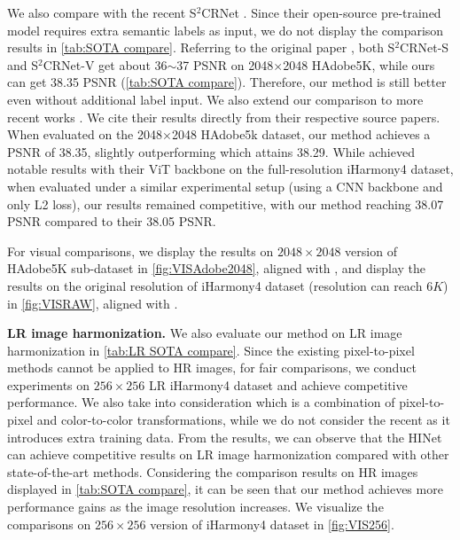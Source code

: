 \documentclass[10pt,journal,twocolumn,twoside]{IEEEtran}
\begin{document}
We also compare with the recent S$^2$CRNet \cite{liang2022spatial}. Since their open-source pre-trained model requires extra semantic labels as input, we do not display the comparison results in \cref{tab:SOTA compare}. Referring to the original paper \cite{liang2022spatial}, both S$^2$CRNet-S and S$^2$CRNet-V get about 36$\sim$37 PSNR on 2048$\times$2048 HAdobe5K, while ours can get 38.35 PSNR (\cref{tab:SOTA compare}). Therefore, our method is still better even without additional label input. We also extend our comparison to more recent works \cite{wang2023semi, guerreiro2023pct}. We cite their results directly from their respective source papers. When evaluated on the 2048$\times$2048 HAdobe5k dataset, our method achieves a PSNR of 38.35, slightly outperforming \cite{wang2023semi} which attains 38.29. While \cite{guerreiro2023pct} achieved notable results with their ViT backbone on the full-resolution iHarmony4 dataset, when evaluated under a similar experimental setup (using a CNN backbone and only L2 loss), our results remained competitive, with our method reaching 38.07 PSNR compared to their 38.05 PSNR.

For visual comparisons, we display the results on $2048\times 2048$ version of HAdobe5K sub-dataset in \cref{fig:VISAdobe2048}, aligned with \cite{cong2022high}, and display the results on the original resolution of iHarmony4 dataset (resolution can reach $6K$) in \cref{fig:VISRAW}, aligned with \cite{xue2022dccf, ke2022harmonizer}.



\textbf{LR image harmonization.} We also evaluate our method on LR image harmonization in \cref{tab:LR SOTA compare}. Since the existing pixel-to-pixel methods \cite{tsai2017deep, cun2020improving, cong2020dovenet, cong2021bargainnet, ling2021region, guo2021intrinsic, guo2021image, sofiiuk2021foreground} cannot be applied to HR images, for fair comparisons, we conduct experiments on $256\times256$ LR iHarmony4 dataset and achieve competitive performance. We also take \cite{cong2022high} into consideration which is a combination of pixel-to-pixel and color-to-color transformations, while we do not consider the recent \cite{hang2022scs} as it introduces extra training data. From the results, we can observe that the HINet can achieve competitive results on LR image harmonization compared with other state-of-the-art methods. Considering the comparison results on HR images displayed in \cref{tab:SOTA compare}, it can be seen that our method achieves more performance gains as the image resolution increases. We visualize the comparisons on $256\times 256$ version of iHarmony4 dataset in \cref{fig:VIS256}. 
\end{document}
